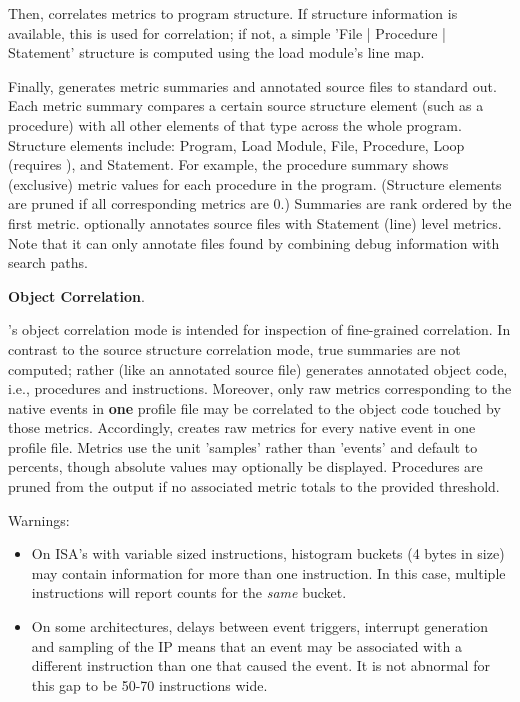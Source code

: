 \documentclass[english]{article}
\begin{document}
Then,  correlates metrics to program structure.
If  structure information is available, this is used for correlation; if not, a simple 'File | Procedure | Statement' structure is computed using the load module's line map.

Finally,  generates metric summaries and annotated source files to standard out.
Each metric summary compares a certain source structure element (such as a procedure) with all other elements of that type across the whole program.
Structure elements include: Program, Load Module, File, Procedure, Loop (requires ), and Statement.
For example, the procedure summary shows (exclusive) metric values for each procedure in the program.
(Structure elements are pruned if all corresponding metrics are 0.)
Summaries are rank ordered by the first metric.
 optionally annotates source files with Statement (line) level metrics.
Note that it can only annotate files found by combining debug information with  search paths.


\textbf{Object Correlation}.

's object correlation mode is intended for inspection of fine-grained correlation.
In contrast to the source structure correlation mode, true summaries are not computed; rather (like an annotated source file)  generates annotated object code, i.e., procedures and instructions.
Moreover, only raw metrics corresponding to the native events in \textbf{one} profile file may be correlated to the object code touched by those metrics.
Accordingly,  creates raw metrics for every native event in one profile file.
Metrics use the unit 'samples' rather than 'events' and default to percents, though absolute values may optionally be displayed.
Procedures are pruned from the output if no associated metric totals to the provided threshold.

Warnings:
\begin{itemize}
\item On ISA's with variable sized instructions, histogram buckets (4 bytes in size) may contain information for more than one instruction.
In this case, multiple instructions will report counts for the \emph{same} bucket.

\item On some architectures, delays between event triggers, interrupt generation and sampling of the IP means that an event may be associated with a different instruction than one that caused the event.  It is not abnormal for this gap to be 50-70 instructions wide.
\end{itemize}
\end{document}
